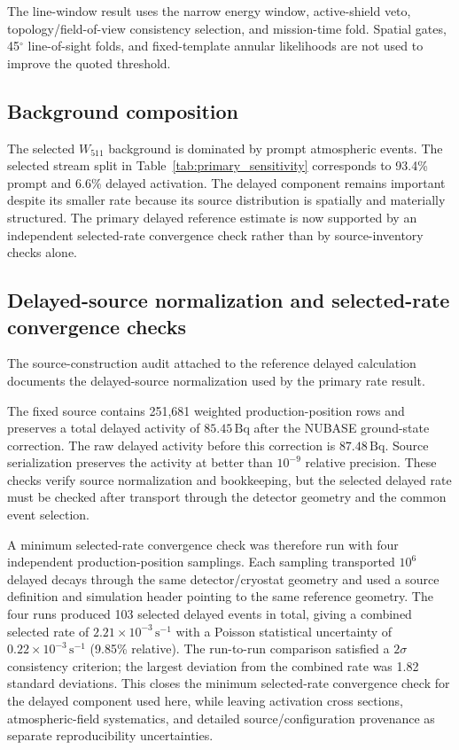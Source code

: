 \documentclass[preprint,12pt]{elsarticle}
\newcommand{\cps}{\,\mathrm{s^{-1}}}
\newcommand{\wii}{W_{511}}
\begin{document}
The line-window result uses the narrow energy window, active-shield veto,
topology/field-of-view consistency selection, and mission-time fold. Spatial
gates, 45$^\circ$ line-of-sight folds, and fixed-template annular likelihoods
are not used to improve the quoted threshold.

\subsection{Background composition}
\label{subsec:bgcomp}

The selected $\wii$ background is dominated by prompt atmospheric events.
The selected stream split in Table~\ref{tab:primary_sensitivity} corresponds
to 93.4\% prompt and 6.6\% delayed activation. The delayed component remains
important despite its smaller rate because its source distribution is spatially
and materially structured. The primary delayed reference estimate is now supported by an
independent selected-rate convergence check rather than by source-inventory
checks alone.

\subsection{Delayed-source normalization and selected-rate convergence checks}
\label{subsec:convergence}

The source-construction audit attached to the reference delayed calculation
documents the delayed-source normalization used by the primary rate result.

The fixed source contains 251,681 weighted production-position rows and
preserves a total delayed activity of $85.45\,\mathrm{Bq}$ after the NUBASE
ground-state correction. The raw delayed activity before this correction is
$87.48\,\mathrm{Bq}$. Source serialization preserves the activity at better
than $10^{-9}$ relative precision. These checks verify source normalization and
bookkeeping, but the selected delayed rate must be checked after transport
through the detector geometry and the common event selection.

A minimum selected-rate convergence check was therefore run with four
independent production-position samplings. Each sampling transported
$10^6$ delayed decays through the same detector/cryostat geometry and used a
source definition and simulation header pointing to the same reference geometry. The four
runs produced 103 selected delayed events in total, giving a combined selected
rate of $2.21\times10^{-3}\cps$ with a Poisson statistical uncertainty of
$0.22\times10^{-3}\cps$ (9.85\% relative). The run-to-run comparison satisfied a
$2\sigma$ consistency criterion; the largest deviation from the combined rate was
1.82 standard deviations. This closes the minimum selected-rate convergence
check for the delayed component used here, while leaving activation cross
sections, atmospheric-field systematics, and detailed source/configuration
provenance as separate reproducibility uncertainties.
\end{document}
